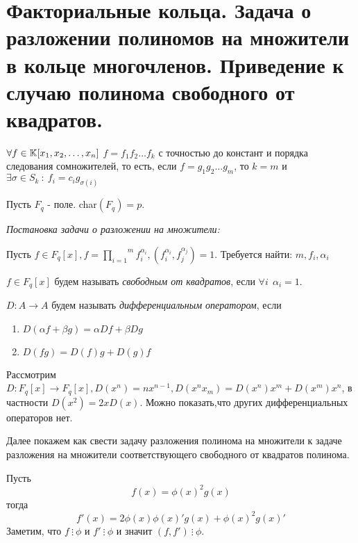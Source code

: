 \section{Факториальные кольца. Задача о разложении полиномов на множители в кольце многочленов. Приведение к случаю полинома свободного от квадратов.}

\begin{thm}
  $ \forall f \in \mathbb{K}[x_1, x_2, \dots, x_n] \\ $
  $ f = f_1f_2{ \dots}f_k $ с точностью до констант и порядка следования сомножителей, то есть, если
  $ f = g_1g_2{\dots}g_m $, то $ k = m $ и $ \exists \sigma \in S_k ~ : ~ f_i = c_ig_{\sigma(i)} $

\end{thm}

Пусть $ F_{q} $ - поле. char$(F_q) = p $. \newline

\emph{Постановка задачи о разложении на множители:} \newline

Пусть $ f \in F_{q}[x],  f = \overset{m}{\underset{i = 1}{\prod}} f_i^{\alpha_i},
 (f_i^{\alpha_i}, f_j^{\alpha_j}) = 1 $. Требуется найти: $ m, f_i, \alpha_i $

\begin{defn}
  $ f \in F_{q}[x] $ будем называть \emph{свободным от квадратов}, если $ \forall i ~~ \alpha_i = 1 $.
\end{defn}

\begin{defn}
  $ D : A \rightarrow A $ будем называть \emph{дифференциальным оператором}, если 
  \begin{enumerate}
    \item $ D({\alpha}f + {\beta}g) = {\alpha}Df + {\beta}Dg $
    \item $ D(fg) = D(f)g + D(g)f $
  \end{enumerate}
\end{defn}

Рассмотрим $ D : F_q[x] \rightarrow F_q[x], D(x^n) = nx^{n-1}, D(x^{n}x_{m}) = D(x^n)x^m + D(x^m)x^n $, 
в частности $ D(x^2) = 2xD(x) $. Можно показать,что других дифференциальных операторов нет.

Далее покажем как свести задачу разложения полинома на множители к задаче разложения на множители соответствующего
свободного от квадратов полинома.

Пусть \[ f(x) = \phi(x)^2g(x) \] тогда \[ f'(x) = 2\phi(x)\phi(x)'g(x) + \phi(x)^2g(x)' \]
Заметим, что $ f ~ \vdots ~ \phi $ и $ f' ~ \vdots ~ \phi $ и значит $ (f, f') ~ \vdots ~ \phi $.

